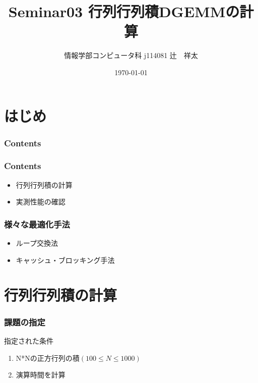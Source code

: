 \documentclass[dvipdfmx]{beamer}
\title[Seminar 3rd]{Seminar03 行列行列積DGEMMの計算}
\institute{Kogakuin University}
\author[Shota Tsuji]{情報学部コンピュータ科 j114081 辻　祥太}
\date{\AdvanceDate[1]\today}
\begin{document}
\section*{はじめ}
\begin{frame}
  \titlepage \end{frame} 
\begin{frame}[plain]
  \frametitle{Contents}
  \tableofcontents
\end{frame}

\begin{frame}
  \frametitle{Contents}
  \begin{itemize}
    \item 行列行列積の計算
    \item 実測性能の確認
  \end{itemize}
\end{frame}

\begin{frame}
	\frametitle{様々な最適化手法}
	\begin{itemize}
		\item ループ交換法
		\item キャッシュ・ブロッキング手法
	\end{itemize}
\end{frame}

\section{行列行列積の計算}
\begin{frame}
  \frametitle{課題の指定}
  指定された条件
  \begin{enumerate}
		\item N*Nの正方行列の積$(100\leq N \leq 1000)$
		\item 演算時間を計算
  \end{enumerate}
\end{frame}
\end{document}
